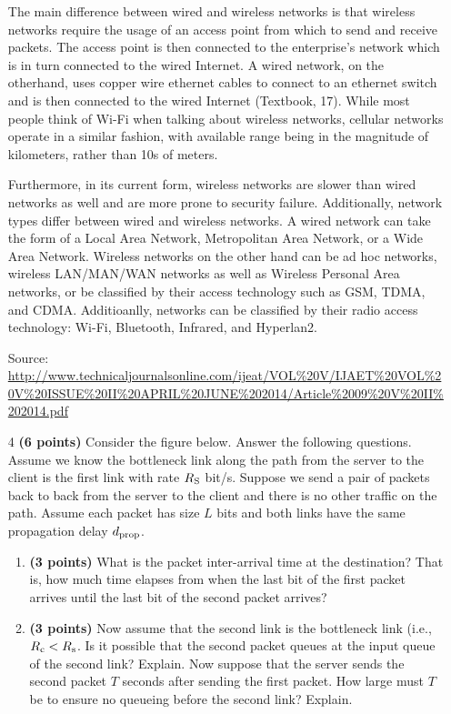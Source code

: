 \documentclass{article}
\begin{document}
\begin{enumerate}
The main difference between wired and wireless networks is that wireless networks require the usage of an access point from which to send and receive packets. The access point is then connected to the enterprise's network which is in turn connected to the wired Internet. A wired network, on the otherhand, uses copper wire ethernet cables to connect to an ethernet switch and is then connected to the wired Internet (Textbook, 17). While most people think of Wi-Fi when talking about wireless networks, cellular networks operate in a similar fashion, with available range being in the magnitude of kilometers, rather than 10s of meters.

Furthermore, in its current form, wireless networks are slower than wired networks as well and are more prone to security failure. Additionally, network types differ between wired and wireless networks. A wired network can take the form of a Local Area Network, Metropolitan Area Network, or a Wide Area Network. Wireless networks on the other hand can be ad hoc networks, wireless LAN/MAN/WAN networks as well as Wireless Personal Area networks, or be classified by their access technology such as GSM, TDMA, and CDMA. Additioanlly, networks can be classified by their radio access technology: Wi-Fi, Bluetooth, Infrared, and Hyperlan2. 

Source: \url{http://www.technicaljournalsonline.com/ijeat/VOL\%20V/IJAET\%20VOL\%20V\%20ISSUE\%20II\%20APRIL\%20JUNE\%202014/Article\%2009\%20V\%20II\%202014.pdf}

\item[4]\textbf{(6 points)} Consider the figure below. Answer the following questions. Assume we know the bottleneck link along the path from the server to the client is the first link with rate $R\textsubscript{S}$ bit/s. Suppose we send a pair of packets back to back from the server to the client and there is no other traffic on the path. Assume each packet has size $L$ bits and both links have the same propagation delay $d\textsubscript{prop}$.

\begin{enumerate}
\item \textbf{(3 points)} What is the packet inter-arrival time at the destination? That is, how much time elapses from when the last bit of the first packet arrives until the last bit of the second packet arrives?
\item \textbf{(3 points)} Now assume that the second link is the bottleneck link (i.e., $R\textsubscript{c} < R\textsubscript{s}$. Is it possible that the second packet queues at the input queue of the second link? Explain. Now suppose that the server sends the second packet $T$ seconds after sending the first packet. How large must $T$ be to ensure no queueing before the second link? Explain.  
\end{enumerate}


\end{enumerate}
\end{document}
